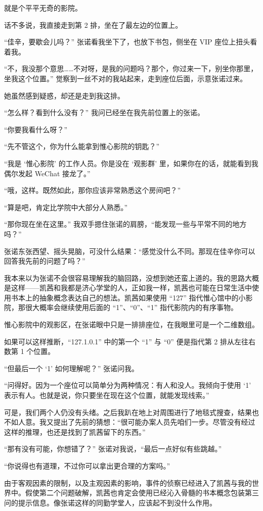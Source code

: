 \documentclass[UTF8]{ctexart}
\begin{document}
就是个平平无奇的影院。

话不多说，我直接走到第 2 排，坐在了最左边的位置上。

“佳辛，要歇会儿吗？” 张诺看我坐下了，也放下书包，侧坐在 VIP 座位上扭头看着我。

“不，我没那个意思……不对呀，是我的问题吗？那个，你过来一下，别坐你那里，坐我这个位置。” 觉察到一丝不对的我站起来，走到座位后面，示意张诺过来。

她虽然感到疑惑，却还是走到我这排。

“怎么样？看到什么没有？” 我问已经坐在我先前位置上的张诺。

“你要我看什么呀？”

“先不管这个，你为什么能拿到惟心影院的钥匙？”

“我是 ‘惟心影院’ 的工作人员。你是没在 ‘观影群’ 里，如果你在的话，就能看到我偶尔发起 WeChat 接龙了。”

“哦，这样。既然如此，那你应该非常熟悉这个房间吧？”

“算是吧，肯定比学院中大部分人熟悉。”

“那你现在坐在这里。” 我双手摁住张诺的肩膀，“能发现一些与平常不同的地方吗？”

张诺东张西望、摇头晃脑，可没什么结果：“感觉没什么不同。那现在佳辛你可以回答我先前的问题了吗？”

我本来以为张诺不会很容易理解我的脑回路，没想到她还蛮上道的。我的思路大概是这样——凯茜和我都是济心学堂的人，正如我一样，凯茜也可能在日常生活中使用书本上的抽象概念表达自己的想法。凯茜如果使用 “127” 指代惟心馆中的小影院，那很大概率会继续使用后面的 “1”、“0”、“1” 指代影院内的有序事物。

惟心影院中的观影区，在张诺眼中只是一排排座位，在我眼里可是一个二维数组。

如果可以这样推断，“127.1.0.1” 中的第一个 “1” 与 “0” 便是指代第 2 排从左往右数第 1 个位置。

“但最后一个 ‘1’ 如何理解呢？” 张诺问我。

“问得好。因为一个座位可以简单分为两种情况：有人和没人。我倾向于使用 ‘1’ 表示有人。也就是说，你只要坐在现在这个位置，就能发现线索。”

可是，我们两个人仍没有头绪。之后我趴在地上对周围进行了地毯式搜查，结果也不如人意。我又提出了先前的猜想：“很可能办案人员先咱们一步。尽管没有经过这样的推理，也还是找到了凯茜留下的东西。”

“那有没有可能，你想错了？” 张诺对我说，“最后一点好似有些跳越。”

“你说得也有道理，不过你可以拿出更合理的方案吗。”

由于客观因素的限制，以及主观因素的影响，事件的侦察已经进入了凯茜与我的世界中。假使第二个问题破解，凯茜也肯定会使用已经沁入骨髓的书本概念包装第三问的提示信息。像张诺这样的同勤学堂人，应该起不到没什么作用。
\end{document}
